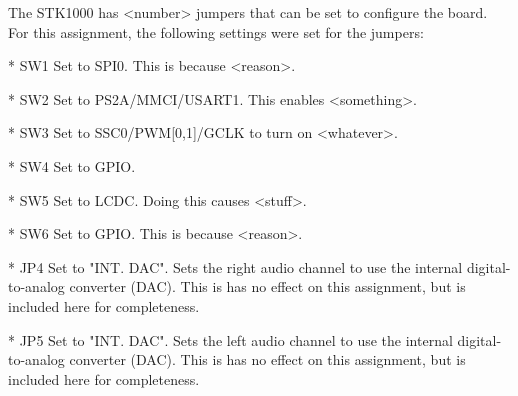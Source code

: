 The STK1000 has <number> jumpers that can be set to configure the board.
For this assignment, the following settings were set for the jumpers:

* SW1
Set to SPI0.
This is because <reason>.


* SW2
Set to PS2A/MMCI/USART1. 
This enables <something>.

* SW3
Set to SSC0/PWM[0,1]/GCLK to turn on <whatever>.

* SW4
Set to GPIO.

* SW5
Set to LCDC.
Doing this causes <stuff>.

* SW6
Set to GPIO.
This is because <reason>.

* JP4
Set to "INT. DAC".
Sets the right audio channel to use the internal digital-to-analog converter (DAC).
This is has no effect on this assignment, but is included here for completeness.

* JP5
Set to "INT. DAC".
Sets the left audio channel to use the internal digital-to-analog converter (DAC).
This is has no effect on this assignment, but is included here for completeness.
